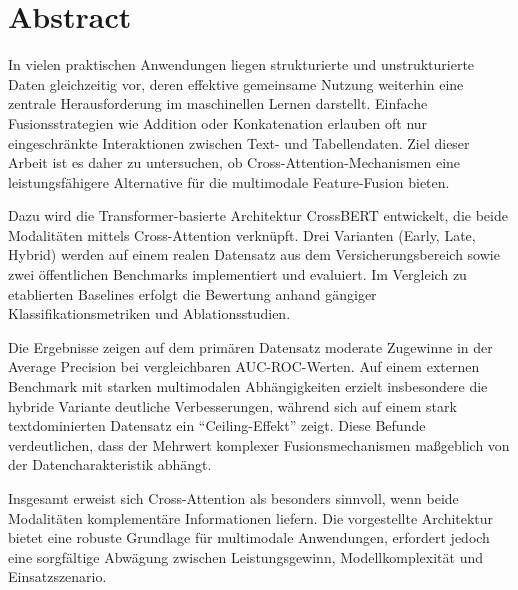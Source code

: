 \section*{Abstract}
In vielen praktischen Anwendungen liegen strukturierte und unstrukturierte Daten gleichzeitig vor, deren effektive gemeinsame Nutzung weiterhin eine zentrale Herausforderung im maschinellen Lernen darstellt. Einfache Fusionsstrategien wie Addition oder Konkatenation erlauben oft nur eingeschränkte Interaktionen zwischen Text- und Tabellendaten. Ziel dieser Arbeit ist es daher zu untersuchen, ob Cross-Attention-Mechanismen eine leistungsfähigere Alternative für die multimodale Feature-Fusion bieten.

Dazu wird die Transformer-basierte Architektur CrossBERT entwickelt, die beide Modalitäten mittels Cross-Attention verknüpft. Drei Varianten (Early, Late, Hybrid) werden auf einem realen Datensatz aus dem Versicherungsbereich sowie zwei öffentlichen Benchmarks implementiert und evaluiert. Im Vergleich zu etablierten Baselines erfolgt die Bewertung anhand gängiger Klassifikationsmetriken und Ablationsstudien.

Die Ergebnisse zeigen auf dem primären Datensatz moderate Zugewinne in der Average Precision bei vergleichbaren AUC-ROC-Werten. Auf einem externen Benchmark mit starken multimodalen Abhängigkeiten erzielt insbesondere die hybride Variante deutliche Verbesserungen, während sich auf einem stark textdominierten Datensatz ein \enquote{Ceiling-Effekt} zeigt. Diese Befunde verdeutlichen, dass der Mehrwert komplexer Fusionsmechanismen maßgeblich von der Datencharakteristik abhängt.

Insgesamt erweist sich Cross-Attention als besonders sinnvoll, wenn beide Modalitäten komplementäre Informationen liefern. Die vorgestellte Architektur bietet eine robuste Grundlage für multimodale Anwendungen, erfordert jedoch eine sorgfältige Abwägung zwischen Leistungsgewinn, Modellkomplexität und Einsatzszenario.
